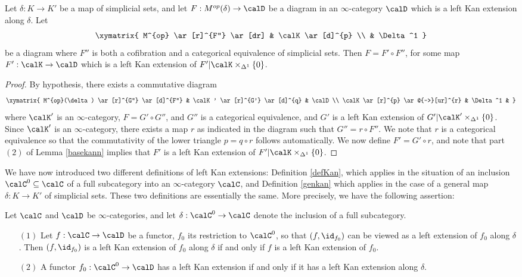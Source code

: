 \begin{proposition}\label{oave}
Let $\delta: K \rightarrow K'$ be a map of simplicial sets, and let
$F: M^{op}(\delta) \rightarrow \calD$ be a diagram in an $\infty$-category $\calD$ which
is a left Kan extension along $\delta$. Let
$$ \xymatrix{ M^{op} \ar[r]^{F''} \ar[dr] & \calK \ar[d]^{p} \\
& \Delta^1 }$$
be a diagram where $F''$ is both a cofibration and a categorical equivalence of simplicial sets. Then $F= F' \circ F''$, for some map $F': \calK \rightarrow \calD$
which is a left Kan extension of $F' | \calK \times_{\Delta^1} \{0\}$.
\end{proposition}

\begin{proof}
By hypothesis, there exists a commutative diagram
$$ \xymatrix{ M^{op}(\delta) \ar[r]^{G''} \ar[d]^{F''} & \calK' \ar[r]^{G'} \ar[d]^{q} & \calD \\
\calK \ar[r]^{p} \ar@{-->}[ur]^{r} & \Delta^1 & }$$
where $\calK'$ is an $\infty$-category, $F = G' \circ G''$, and $G''$ is a categorical equivalence, and
$G'$ is a left Kan extension of $G' | \calK' \times_{\Delta^1} \{0\}$. Since $\calK'$ is an
$\infty$-category, there exists a map $r$ as indicated in the diagram such that
$G'' = r \circ F''$. We note that $r$ is a categorical equivalence so that the commutativity
of the lower triangle $p = q \circ r$ follows automatically. We now define
$F' = G' \circ r$, and note that part $(2)$ of Lemma \ref{basekann} implies that $F'$ 
is a left Kan extension of $F'| \calK \times_{\Delta^1} \{0\}$.
\end{proof}

We have now introduced two different definitions of left Kan extensions: Definition \ref{defKan}, which applies in the situation of an inclusion $\calC^{0} \subseteq \calC$ of a full subcategory into an $\infty$-category $\calC$, and Definition \ref{genkan} which applies in the case of a general map $\delta: K \rightarrow K'$ of simplicial sets. These two definitions are essentially the same. More precisely, we have the following assertion:

\begin{proposition}\label{compkan}
Let $\calC$ and $\calD$ be $\infty$-categories, and let $\delta: \calC^{0} \rightarrow \calC$ denote the inclusion of a full subcategory.

\begin{itemize}
\item[$(1)$] Let $f: \calC \rightarrow \calD$ be a functor, $f_0$ its restriction to $\calC^{0}$, so that $( f, \id_{f_0})$ can be viewed as a left extension of $f_0$ along $\delta$.
Then $(f, \id_{f_0})$ is a left Kan extension of $f_0$ along $\delta$ if and only if $f$ is a left Kan extension of $f_0$.  

\item[$(2)$] A functor $f_0: \calC^{0} \rightarrow \calD$ has a left Kan extension
if and only if it has a left Kan extension along $\delta$.
\end{itemize}
\end{proposition}

